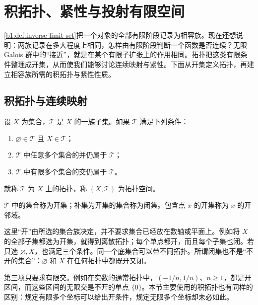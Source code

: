 
\section{积拓扑、紧性与投射有限空间}
\label{b1:sec:A03}

\cref{b1:def:inverse-limit-set}把一个对象的全部有限阶段记录为相容族。现在还想说明：两族记录在多大程度上相同，怎样由有限阶段判断一个函数是否连续？无限 Galois 群中的“接近”，就是在某个有限子扩张上的作用相同。拓扑把这类有限条件整理成开集，从而使我们能够讨论连续映射与紧性。下面从开集定义拓扑，再建立相容族所需的积拓扑与紧性性质。

\subsection{积拓扑与连续映射}
\label{b1:subsec:A03:01}

\begin{definition}\label{b1:def:topology-appendix}
	设 \(X\) 为集合，\(\mathcal T\) 是 \(X\) 的一族子集。如果 \(\mathcal T\) 满足下列条件：
	\begin{enumerate}
		\item \(\varnothing\in\mathcal T\) 且 \(X\in\mathcal T\)；
		\item \(\mathcal T\) 中任意多个集合的并仍属于 \(\mathcal T\)；
		\item \(\mathcal T\) 中有限多个集合的交仍属于 \(\mathcal T\)。
	\end{enumerate}
	就称 \(\mathcal T\) 为 \(X\) 上的拓扑，称 \((X,\mathcal T)\) 为拓扑空间。

	\(\mathcal T\) 中的集合称为开集；补集为开集的集合称为闭集。包含点 \(x\) 的开集称为 \(x\) 的开邻域。
\end{definition}

这里“开”由所选的集合族决定，并不要求集合已经放在数轴或平面上。例如将 \(X\) 的全部子集都选为开集，就得到离散拓扑；每个单点都开，而且每个子集也闭。若只选 \(\varnothing,X\)，也满足三个条件。同一个底集合可以带不同拓扑。所谓闭集也不是“不开的集合”：\(\varnothing\) 和 \(X\) 在任何拓扑中都既开又闭。

\ProseParagraphBreak
第三项只要求有限交。例如在实数的通常拓扑中，\((-1/n,1/n)\)、\(n\geq1\)，都是开区间，而这些区间的无限交是不开的单点 \(\{0\}\)。本节主要使用的积拓扑也有同样的区别：规定有限多个坐标可以给出开条件，规定无限多个坐标却未必如此。

